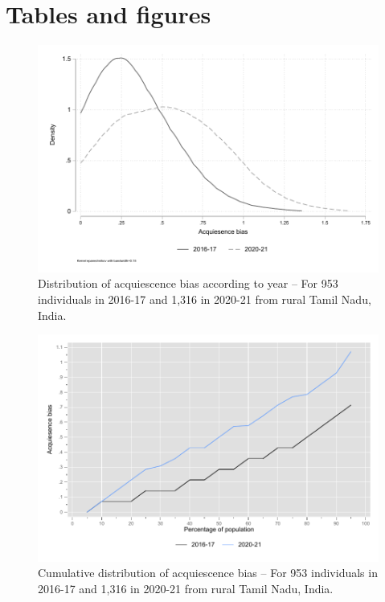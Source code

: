 \documentclass[a4paper, 12pt, onecolumn]{article}
\begin{document}
\clearpage
\newpage
\section*{Tables and figures}

\begin{figure}[!h]
\raggedright
\includegraphics[scale=0.8]{INPUT/kernel_ars}
\caption{Distribution of acquiescence bias according to year -- For 953 individuals in 2016-17 and 1,316 in 2020-21 from rural Tamil Nadu, India.}
\label{fig:ars}
\end{figure}

\begin{figure}[!h]
\raggedright
\includegraphics[scale=0.8]{INPUT/curve_ars}
\caption{Cumulative distribution of acquiescence bias -- For 953 individuals in 2016-17 and 1,316 in 2020-21 from rural Tamil Nadu, India.}
\label{fig:curvears}
\end{figure}
\end{document}
